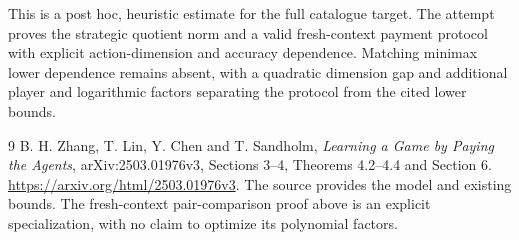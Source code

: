\documentclass[11pt,a4paper]{article}
\begin{document}
This is a post hoc, heuristic estimate for the full catalogue target.
The attempt proves the strategic quotient norm and a valid fresh-context payment protocol with explicit action-dimension and accuracy dependence. Matching minimax lower dependence remains absent, with a quadratic dimension gap and additional player and logarithmic factors separating the protocol from the cited lower bounds.

\begin{thebibliography}{9}
 B. H. Zhang, T. Lin, Y. Chen and T. Sandholm, \emph{Learning a Game by Paying the Agents}, arXiv:2503.01976v3, Sections 3--4, Theorems 4.2--4.4 and Section 6. \url{https://arxiv.org/html/2503.01976v3}. The source provides the model and existing bounds. The fresh-context pair-comparison proof above is an explicit specialization, with no claim to optimize its polynomial factors.
\end{thebibliography}
\end{document}

